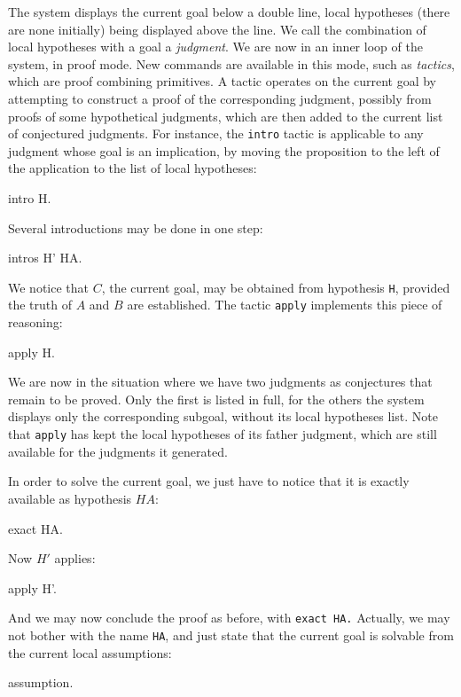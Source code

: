 \documentclass[11pt,a4paper]{book}
\begin{document}
The system displays the current goal below a double line, local hypotheses
(there are none initially) being displayed above the line. We call
the combination of local hypotheses with a goal a {\sl judgment}.
We are now in an inner
loop of the system, in proof mode.
New commands are available in this
mode, such as {\sl tactics}, which are proof combining primitives.
A tactic operates on the current goal by attempting to construct a proof
of the corresponding judgment, possibly from proofs of some
hypothetical judgments, which are then added to the current
list of conjectured judgments.
For instance, the \verb:intro: tactic is applicable to any judgment
whose goal is an implication, by moving the proposition to the left
of the application to the list of local hypotheses:
\begin{coq_example}
intro H.
\end{coq_example}

Several introductions may be done in one step:
\begin{coq_example}
intros H' HA.
\end{coq_example}

We notice that $C$, the current goal, may be obtained from hypothesis
\verb:H:, provided the truth of $A$ and $B$ are established.
The tactic \verb:apply: implements this piece of reasoning:
\begin{coq_example}
apply H.
\end{coq_example}

We are now in the situation where we have two judgments as conjectures
that remain to be proved. Only the first is listed in full, for the
others the system displays only the corresponding subgoal, without its
local hypotheses list. Note that \verb:apply: has kept the local
hypotheses of its father judgment, which are still available for
the judgments it generated.

In order to solve the current goal, we just have to notice that it is
exactly available as hypothesis $HA$:
\begin{coq_example}
exact HA.
\end{coq_example}

Now $H'$ applies:
\begin{coq_example}
apply H'.
\end{coq_example}

And we may now conclude the proof as before, with \verb:exact HA.:
Actually, we may not bother with the name \verb:HA:, and just state that
the current goal is solvable from the current local assumptions:
\begin{coq_example}
assumption.
\end{coq_example}
\end{document}

